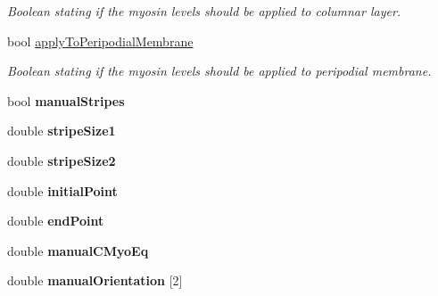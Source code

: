 \begin{DoxyCompactItemize}
\begin{DoxyCompactList}\small\item\em Boolean stating if the myosin levels should be applied to columnar layer. \end{DoxyCompactList}\item 
\hypertarget{classMyosinFunction_a76b32da8850a97ca48046d34542ee1c0}{}bool \hyperlink{classMyosinFunction_a76b32da8850a97ca48046d34542ee1c0}{apply\+To\+Peripodial\+Membrane}\label{classMyosinFunction_a76b32da8850a97ca48046d34542ee1c0}

\begin{DoxyCompactList}\small\item\em Boolean stating if the myosin levels should be applied to peripodial membrane. \end{DoxyCompactList}\item 
\hypertarget{classMyosinFunction_af9847dcd6e9db66662d90e3e4ba4cc0b}{}bool {\bfseries manual\+Stripes}\label{classMyosinFunction_af9847dcd6e9db66662d90e3e4ba4cc0b}

\item 
\hypertarget{classMyosinFunction_aae36807a55b8886c6ebfe24598a160ea}{}double {\bfseries stripe\+Size1}\label{classMyosinFunction_aae36807a55b8886c6ebfe24598a160ea}

\item 
\hypertarget{classMyosinFunction_a540d49e3dbb0b6b119eebfa3d3dcb4bb}{}double {\bfseries stripe\+Size2}\label{classMyosinFunction_a540d49e3dbb0b6b119eebfa3d3dcb4bb}

\item 
\hypertarget{classMyosinFunction_a71b4c116055c970cd05c4ecd9fbeca6a}{}double {\bfseries initial\+Point}\label{classMyosinFunction_a71b4c116055c970cd05c4ecd9fbeca6a}

\item 
\hypertarget{classMyosinFunction_a21f2a844af80cb09c37fbc9b20909c7f}{}double {\bfseries end\+Point}\label{classMyosinFunction_a21f2a844af80cb09c37fbc9b20909c7f}

\item 
\hypertarget{classMyosinFunction_acfa8ebd891b11162a806a8ebf9b6f39a}{}double {\bfseries manual\+C\+Myo\+Eq}\label{classMyosinFunction_acfa8ebd891b11162a806a8ebf9b6f39a}

\item 
\hypertarget{classMyosinFunction_a8e71a34d5be53e6eb7c1d3621fe72455}{}double {\bfseries manual\+Orientation} \mbox{[}2\mbox{]}\label{classMyosinFunction_a8e71a34d5be53e6eb7c1d3621fe72455}


\end{DoxyCompactItemize}

